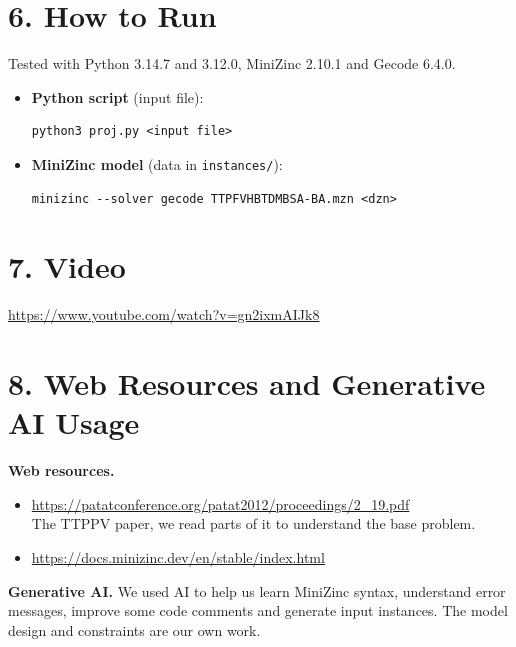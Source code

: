 \documentclass[10pt,a4paper,twocolumn]{article}
\begin{document}
\section*{6. How to Run}

Tested with Python 3.14.7 and 3.12.0, MiniZinc 2.10.1 and Gecode 6.4.0.

\begin{itemize}[topsep=3pt,itemsep=6pt]
    \item \textbf{Python script} (input file):
\begin{codebox}
\begin{verbatim}
python3 proj.py <input file>
\end{verbatim}
\end{codebox}
    \item \textbf{MiniZinc model} (data in \texttt{instances/}):
\begin{codebox}
\begin{verbatim}
minizinc --solver gecode TTPFVHBTDMBSA-BA.mzn <dzn>
\end{verbatim}
\end{codebox}
\end{itemize}

\section*{7. Video}

\url{https://www.youtube.com/watch?v=gn2ixmAIJk8}

\section*{8. Web Resources and Generative AI Usage}

\textbf{Web resources.}
\begin{itemize}
    \item \url{https://patatconference.org/patat2012/proceedings/2_19.pdf}\\
    The TTPPV paper, we read parts of it to understand the base problem.
    \item \url{https://docs.minizinc.dev/en/stable/index.html}\\
\end{itemize}

\smallskip
\noindent\textbf{Generative AI.}
We used AI to help us learn MiniZinc syntax, understand error messages, improve some code comments and generate input instances.
The model design and constraints are our own work.
\end{document}
